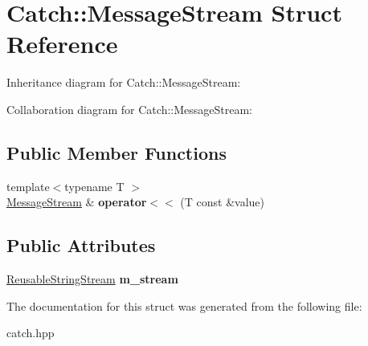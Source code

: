 \hypertarget{structCatch_1_1MessageStream}{}\section{Catch\+:\+:Message\+Stream Struct Reference}
\label{structCatch_1_1MessageStream}


Inheritance diagram for Catch\+:\+:Message\+Stream\+:


Collaboration diagram for Catch\+:\+:Message\+Stream\+:
\subsection*{Public Member Functions}
\begin{DoxyCompactItemize}
\item 
{\footnotesize template$<$typename T $>$ }\\\hyperlink{structCatch_1_1MessageStream}{Message\+Stream} \& {\bfseries operator$<$$<$} (T const \&value)\hypertarget{structCatch_1_1MessageStream_a554c4aff5925a077e9fe9d858217428d}{}\label{structCatch_1_1MessageStream_a554c4aff5925a077e9fe9d858217428d}

\end{DoxyCompactItemize}
\subsection*{Public Attributes}
\begin{DoxyCompactItemize}
\item 
\hyperlink{classCatch_1_1ReusableStringStream}{Reusable\+String\+Stream} {\bfseries m\+\_\+stream}\hypertarget{structCatch_1_1MessageStream_a9202520faed8882ef469db9f353ec578}{}\label{structCatch_1_1MessageStream_a9202520faed8882ef469db9f353ec578}

\end{DoxyCompactItemize}


The documentation for this struct was generated from the following file\+:\begin{DoxyCompactItemize}
\item 
catch.\+hpp\end{DoxyCompactItemize}
